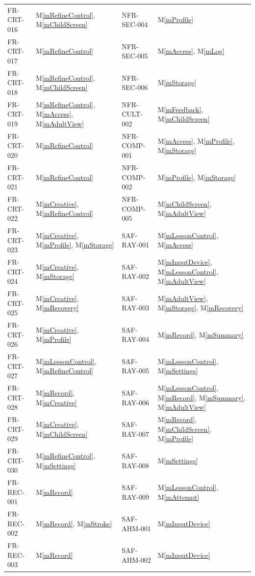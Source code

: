 \documentclass[12pt, titlepage]{article}
\newcommand{\mref}[1]{M\ref{#1}}
\begin{document}
{\begin{longtable}{@{}p{} p{} p{}
p{}@{}}
FR-CRT-016 & \mref{mRefineControl}, \mref{mChildScreen} &
  NFR-SEC-004 & \mref{mProfile}\\
FR-CRT-017 & \mref{mRefineControl} &
  NFR-SEC-005 & \mref{mAccess}, \mref{mLog}\\
FR-CRT-018 & \mref{mRefineControl}, \mref{mChildScreen} &
  NFR-SEC-006 & \mref{mStorage}\\
FR-CRT-019 & \mref{mRefineControl}, \mref{mAccess}, \mref{mAdultView} &
  NFR-CULT-002 & \mref{mFeedback}, \mref{mChildScreen}\\
FR-CRT-020 & \mref{mRefineControl} &
  NFR-COMP-001 & \mref{mAccess}, \mref{mProfile}, \mref{mStorage}\\
FR-CRT-021 & \mref{mRefineControl} &
  NFR-COMP-002 & \mref{mProfile}, \mref{mStorage}\\
FR-CRT-022 & \mref{mCreative}, \mref{mRefineControl} &
  NFR-COMP-005 & \mref{mChildScreen}, \mref{mAdultView}\\
FR-CRT-023 & \mref{mCreative}, \mref{mProfile}, \mref{mStorage} &
  SAF-RAY-001 & \mref{mLessonControl}, \mref{mAccess}\\
FR-CRT-024 & \mref{mCreative}, \mref{mStorage} &
  SAF-RAY-002 & \mref{mInputDevice}, \mref{mLessonControl}, \mref{mAdultView}\\
FR-CRT-025 & \mref{mCreative}, \mref{mRecovery} &
  SAF-RAY-003 & \mref{mAdultView}, \mref{mStorage}, \mref{mRecovery}\\
FR-CRT-026 & \mref{mCreative}, \mref{mProfile} &
  SAF-RAY-004 & \mref{mRecord}, \mref{mSummary}\\
FR-CRT-027 & \mref{mLessonControl}, \mref{mRefineControl} &
  SAF-RAY-005 & \mref{mLessonControl}, \mref{mSettings}\\
FR-CRT-028 & \mref{mRecord}, \mref{mCreative} &
  SAF-RAY-006 & \mref{mLessonControl}, \mref{mRecord}, \mref{mSummary},
    \mref{mAdultView}\\
FR-CRT-029 & \mref{mCreative}, \mref{mChildScreen} &
  SAF-RAY-007 & \mref{mRecord}, \mref{mChildScreen}, \mref{mProfile}\\
FR-CRT-030 & \mref{mRefineControl}, \mref{mSettings} &
  SAF-RAY-008 & \mref{mSettings}\\
FR-REC-001 & \mref{mRecord} &
  SAF-RAY-009 & \mref{mLessonControl}, \mref{mAttempt}\\
FR-REC-002 & \mref{mRecord}, \mref{mStroke} &
  SAF-AHM-001 & \mref{mInputDevice}\\
FR-REC-003 & \mref{mRecord} &
  SAF-AHM-002 & \mref{mInputDevice}\\

\end{longtable}}
\end{document}
